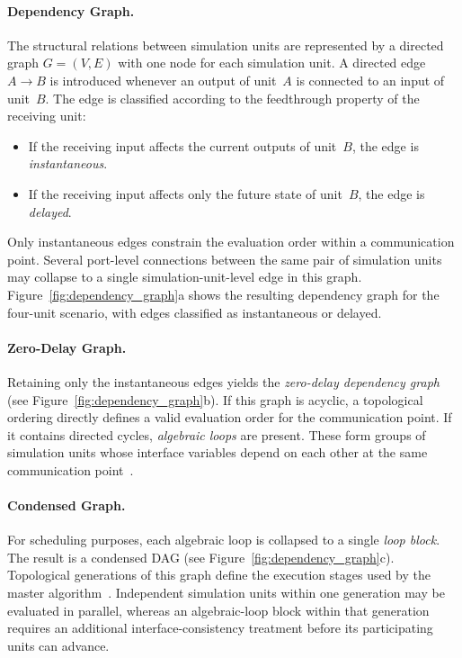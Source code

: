 \paragraph{Dependency Graph.}
The structural relations between simulation units are represented by a directed graph $G = (V,E)$ with one node for each simulation unit.
A directed edge $A \rightarrow B$ is introduced whenever an output of unit~$A$ is connected to an input of unit~$B$.
The edge is classified according to the feedthrough property of the receiving
unit:
\begin{itemize}
    \item If the receiving input affects the current outputs of unit~$B$, the
          edge is \emph{instantaneous}.
    \item If the receiving input affects only the future state of unit~$B$,
          the edge is \emph{delayed}.
\end{itemize}
Only instantaneous edges constrain the evaluation order within a communication point.
Several port-level connections between the same pair of simulation units may collapse to a single simulation-unit-level edge in this graph.
Figure~\ref{fig:dependency_graph}a shows the resulting dependency graph for the four-unit scenario, with edges classified as instantaneous or delayed.

\paragraph{Zero-Delay Graph.}
Retaining only the instantaneous edges yields the \emph{zero-delay dependency graph} (see Figure~\ref{fig:dependency_graph}b).
If this graph is acyclic, a topological ordering directly defines a valid evaluation order for the communication point.
If it contains directed cycles, \emph{algebraic loops} are present.
These form groups of simulation units whose interface variables depend on each other at the same communication point~\cite{hansen_verification_2021}.

\paragraph{Condensed Graph.}

For scheduling purposes, each algebraic loop is collapsed to a single \emph{loop block}.
The result is a condensed \ac{DAG} (see Figure~\ref{fig:dependency_graph}c).
Topological generations of this graph define the execution stages used by the master algorithm~\cite{gomes_co-simulation_2018,petridis_test_2015}.
Independent simulation units within one generation may be evaluated in parallel, whereas an algebraic-loop block within that generation requires an additional interface-consistency treatment before its participating units can advance.

